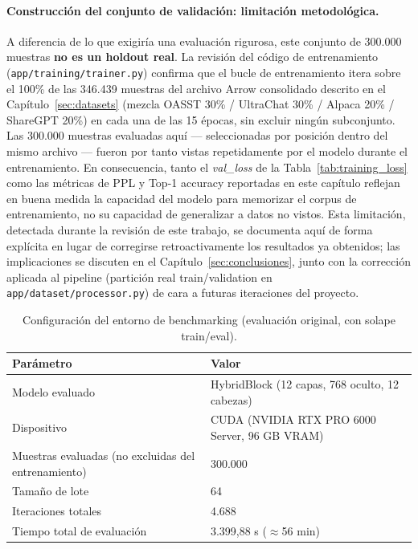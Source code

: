 \paragraph{Construcción del conjunto de validación: limitación metodológica.} A diferencia de lo que exigiría una evaluación rigurosa, este conjunto de 300.000 muestras \textbf{no es un holdout real}. La revisión del código de entrenamiento (\texttt{app/training/trainer.py}) confirma que el bucle de entrenamiento itera sobre el 100\% de las 346.439 muestras del archivo Arrow consolidado descrito en el Capítulo~\ref{sec:datasets} (mezcla OASST 30\% / UltraChat 30\% / Alpaca 20\% / ShareGPT 20\%) en cada una de las 15 épocas, sin excluir ningún subconjunto. Las 300.000 muestras evaluadas aquí --- seleccionadas por posición dentro del mismo archivo --- fueron por tanto vistas repetidamente por el modelo durante el entrenamiento. En consecuencia, tanto el \textit{val\_loss} de la Tabla~\ref{tab:training_loss} como las métricas de PPL y Top-1 accuracy reportadas en este capítulo reflejan en buena medida la capacidad del modelo para memorizar el corpus de entrenamiento, no su capacidad de generalizar a datos no vistos. Esta limitación, detectada durante la revisión de este trabajo, se documenta aquí de forma explícita en lugar de corregirse retroactivamente los resultados ya obtenidos; las implicaciones se discuten en el Capítulo~\ref{sec:conclusiones}, junto con la corrección aplicada al pipeline (partición real train/validation en \texttt{app/dataset/processor.py}) de cara a futuras iteraciones del proyecto.

\begin{table}[H]
\centering
\begin{tabularx}{\textwidth}{|l|X|}
\hline
\textbf{Parámetro} & \textbf{Valor} \\ \hline
Modelo evaluado & HybridBlock (12 capas, 768 oculto, 12 cabezas) \\ \hline
Dispositivo & CUDA (NVIDIA RTX PRO 6000 Server, 96 GB VRAM) \\ \hline
Muestras evaluadas (no excluidas del entrenamiento) & 300.000 \\ \hline
Tamaño de lote & 64 \\ \hline
Iteraciones totales & 4.688 \\ \hline
Tiempo total de evaluación & 3.399,88 s ($\approx$56 min) \\ \hline
\end{tabularx}
\caption{Configuración del entorno de benchmarking (evaluación original, con solape train/eval).}
\label{tab:benchmark_config}
\end{table}

